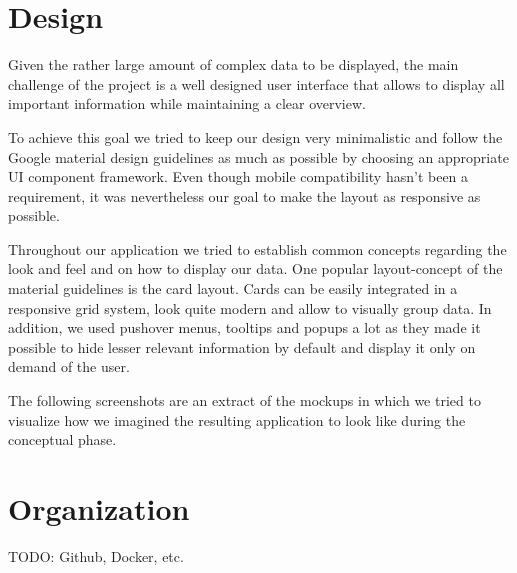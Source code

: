 \section{Design}
Given the rather large amount of complex data to be displayed, the main challenge of the project is a well designed user interface that allows to display all important information while maintaining a clear overview.

To achieve this goal we tried to keep our design very minimalistic and follow the Google material design guidelines as much as possible by choosing an appropriate UI component framework. Even though mobile compatibility hasn't been a requirement, it was nevertheless our goal to make the layout as responsive as possible.

Throughout our application we tried to establish common concepts regarding the look and feel and on how to display our data. One popular layout-concept of the material guidelines is the card layout. Cards can be easily integrated in a responsive grid system, look quite modern and allow to visually group data. In addition, we used pushover menus, tooltips and popups a lot as they made it possible to hide lesser relevant information by default and display it only on demand of the user.

The following screenshots are an extract of the mockups in which we tried to visualize how we imagined the resulting application to look like during the conceptual phase. 


\section{Organization}
TODO: Github, Docker, etc.
